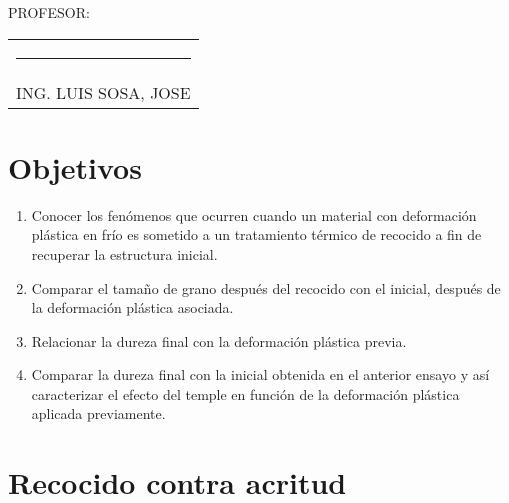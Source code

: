 \documentclass[a4paper,12pt]{report}
\begin{document}
{\large PROFESOR:} \\[1.15cm]
\begin{center}
\begin{tabular}{c}
\rule[3pt]{4.8in}{1pt}\\[1pt]
ING. LUIS SOSA, JOSE 
\end{tabular}
\end{center}
\vfill
\newpage
\tableofcontents
\listoffigures
{}
\chapter{Objetivos}
\begin{enumerate}
\item Conocer los fenómenos que ocurren cuando un material con deformación plástica en frío es sometido a un tratamiento térmico de recocido a fin de recuperar la estructura inicial.
\item Comparar el tamaño de grano después del recocido con el inicial, después de la deformación plástica asociada.
\item Relacionar la dureza final con la deformación plástica previa. 
\item Comparar la dureza final con la inicial obtenida en el anterior ensayo y así caracterizar el efecto del temple en función de la deformación plástica aplicada previamente. 
\end{enumerate}
\setcounter{page}{1}  %
\chapter{Recocido contra acritud}
\end{document}
